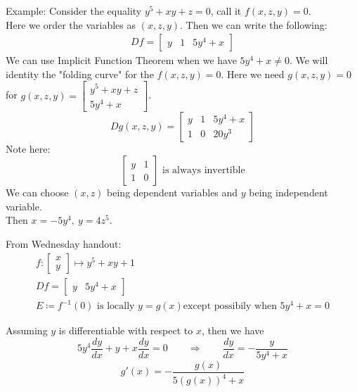 \documentclass[11pt]{article}
\theoremstyle{break}
\theoremstyle{break}
\newcommand{\example}{\color{green}Example: \color{black}}
\begin{document}
\newpage
\example Consider the equality $y^5 + xy +z = 0$, call it $f(x,z,y) = 0$. \\Here we order the variables as $(x,z,y)$. Then we can write the following:
\begin{align*}
Df = \begin{bmatrix}
y & 1 & 5y^4+x
\end{bmatrix}
\end{align*}
We can use Implicit Function Theorem when we have $5y^4+x \neq 0$. We will identity the "folding curve" for the $f(x,z,y)=0$. Here we need $g(x,z,y)=0$ for $g(x,z,y) =\begin{bmatrix}
y^5 +xy+z \\ 5y^4+x
\end{bmatrix} $.\\
$$Dg(x,z,y) =\begin{bmatrix}
y & 1 & 5y^4+x \\ 1 & 0 & 20y^3
\end{bmatrix}  $$
Note here: $$\begin{bmatrix}
y & 1 \\ 1 & 0
\end{bmatrix}\text{ is always invertible}$$
We can choose $(x,z)$ being dependent variables and $y$ being independent variable.\\ Then $x = -5y^4,\ y=4z^5$.


From Wednesday handout:
\begin{align*}
f: \begin{bmatrix}
x \\y 
\end{bmatrix} \mapsto y^5 + xy +1 \\
Df = \begin{bmatrix}
y & 5y^4 + x
\end{bmatrix}\\
E \coloneqq f^{-1}(0) \text{ is locally } y = g(x) \text{except possibily when } 5y^4 + x = 0
\end{align*}

Assuming $y$ is differentiable with respect to $x$, then we have $$5y^4\frac{dy}{dx}+ y + x\frac{dy}{dx} = 0 \qquad\Rightarrow\qquad \frac{dy}{dx} = -\frac{y}{5y^4+x}$$
$$g'(x) = -\frac{g(x)}{5(g(x))^4 + x}$$
\end{document}
